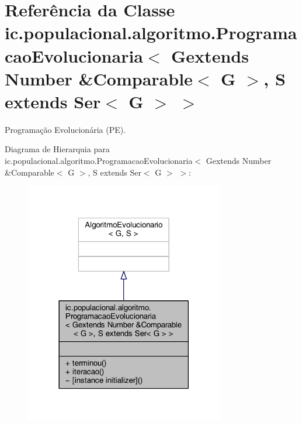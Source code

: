 \hypertarget{classic_1_1populacional_1_1algoritmo_1_1_programacao_evolucionaria_3_01_gextends_01_number_01_6_8364919866d606ef485dd5624b0253b0}{\section{Referência da Classe ic.\-populacional.\-algoritmo.\-Programacao\-Evolucionaria$<$ Gextends Number \&Comparable$<$ G $>$, S extends Ser$<$ G $>$ $>$}
\label{classic_1_1populacional_1_1algoritmo_1_1_programacao_evolucionaria_3_01_gextends_01_number_01_6_8364919866d606ef485dd5624b0253b0}
}


Programação Evolucionária (P\-E).  




Diagrama de Hierarquia para ic.\-populacional.\-algoritmo.\-Programacao\-Evolucionaria$<$ Gextends Number \&Comparable$<$ G $>$, S extends Ser$<$ G $>$ $>$\-:\nopagebreak
\begin{figure}[H]
\begin{center}
\leavevmode
\includegraphics[width=246pt]{classic_1_1populacional_1_1algoritmo_1_1_programacao_evolucionaria_3_01_gextends_01_number_01_6_e51e5c2168ed902e3f14bd8d6a778a3b}
\end{center}
\end{figure}


